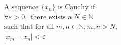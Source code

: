 \documentclass[preview]{standalone}
\begin{document}
\begin{align*}
\text{A sequence } \{x_n\} \text{ is Cauchy if } \\\forall \varepsilon > 0, \text{ there exists a } N \in \mathbb{N} \\\text{such that for all } m, n \in \mathbb{N}, m, n > N, \\|x_m - x_n| < \varepsilon
\end{align*}
\end{document}
